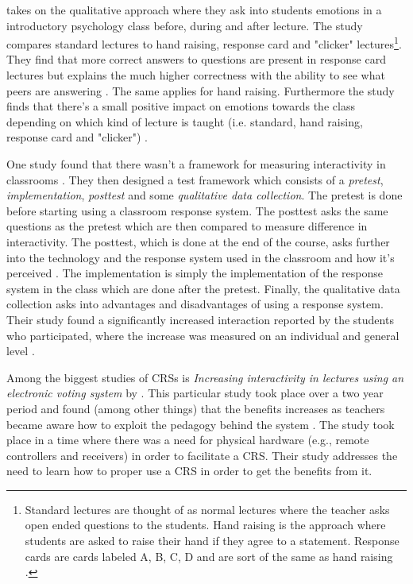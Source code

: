  takes on the qualitative approach where they ask into students emotions in a introductory psychology class before, during and after lecture. The study compares standard lectures to hand raising, response card and "clicker" lectures\footnote{Standard lectures are thought of as normal lectures where the teacher asks open ended questions to the students. Hand raising is the approach where students are asked to raise their hand if they agree to a statement. Response cards are cards labeled A, B, C, D and are sort of the same as hand raising \cite[p.~254]{stowell2007benefits}.}.
They find that more correct answers to questions are present in response card lectures but explains the much higher correctness with the ability to see what peers are answering \cite[p.~257]{stowell2007benefits}. The same applies for hand raising. Furthermore the study finds that there's a small positive impact on emotions towards the class depending on which kind of lecture is taught (i.e. standard, hand raising, response card and "clicker") \cite{stowell2007benefits}.

One study found that there wasn't a framework for measuring interactivity in classrooms \cite[p.~400]{siau2006use}. They then designed a test framework which consists of a \emph{pretest}, \emph{implementation}, \emph{posttest} and some \emph{qualitative data collection}. The pretest is done before starting using a classroom response system. The posttest asks the same questions as the pretest which are then compared to measure difference in interactivity. The posttest, which is done at the end of the course, asks further into the technology and the response system used in the classroom and how it's perceived \cite{siau2006use}. The implementation is simply the implementation of the response system in the class which are done after the pretest. Finally, the qualitative data collection asks into advantages and disadvantages of using a response system. Their study found a significantly increased interaction reported by the students who participated, where the increase was measured on an individual and general level \cite[p.~400]{siau2006use}.


Among the biggest studies of CRSs is \emph{Increasing interactivity in lectures using an electronic voting system} by . This particular study took place over a two year period and found (among other things) that the benefits increases as teachers became aware how to exploit the pedagogy behind the system \cite[p.~93]{draper2004increasing}. The study took place in a time where there was a need for physical hardware (e.g., remote controllers and receivers) in order to facilitate a CRS. Their study addresses the need to learn how to proper use a CRS in order to get the benefits from it.

